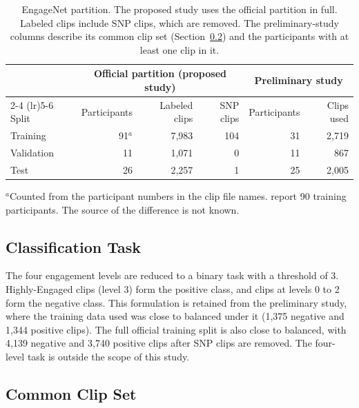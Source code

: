 \begin{table}[t]
   \centering
   \caption[EngageNet partition]{EngageNet partition. The proposed study uses the official partition in full. Labeled clips include SNP clips, which are removed. The preliminary-study columns describe its common clip set (Section~\ref{sec:commonset}) and the participants with at least one clip in it.}
   \label{tab:splits}
   \small
   \begin{tabular}{lrrrrr}
      \toprule
      & \multicolumn{3}{c}{Official partition (proposed study)} & \multicolumn{2}{c}{Preliminary study} \\
      \cmidrule(lr){2-4} \cmidrule(lr){5-6}
      Split & Participants & Labeled clips & SNP clips & Participants & Clips used \\
      \midrule
      Training & 91$^{a}$ & 7,983 & 104 & 31 & 2,719 \\
      Validation & 11 & 1,071 & 0 & 11 & 867 \\
      Test & 26 & 2,257 & 1 & 25 & 2,005 \\
      \bottomrule
   \end{tabular}

   \vspace{0.5ex}
   {\footnotesize $^{a}$Counted from the participant numbers in the clip file names.  report 90 training participants. The source of the difference is not known.\par}
\end{table}

\subsection{Classification Task}

The four engagement levels are reduced to a binary task with a threshold of 3. Highly-Engaged clips (level 3) form the positive class, and clips at levels 0 to 2 form the negative class. This formulation is retained from the preliminary study, where the training data used was close to balanced under it (1,375 negative and 1,344 positive clips). The full official training split is also close to balanced, with 4,139 negative and 3,740 positive clips after SNP clips are removed. The four-level task is outside the scope of this study.

\subsection{Common Clip Set}
\label{sec:commonset}

